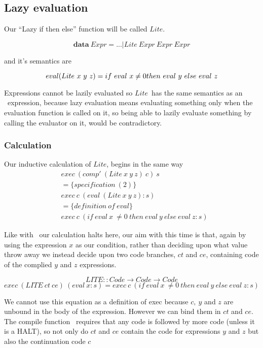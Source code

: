 \documentclass {article}
\begin{document}
\subsection{Lazy evaluation}

\newcommand{\lite}{$Lite$}

Our ``Lazy if then else'' function
 will be called \lite.

	\[ \textbf{data}\ Expr = ... | Lite\ Expr\ Expr\ Expr \]

and it's semantics are

\begin{equation}
eval(Lite\ x\ y\ z) \\
	= if\ eval\ x \not= 0 then\ eval\ y\ else\ eval\ z 
			\label{evallite}
\end{equation}

Expressions cannot be lazily evaluated
so \lite\ has the same semantics
as an \ite\ expression,
because lazy evaluation means evaluating
something only when the evaluation function
is called on it,
so being able to lazily evaluate something 
by calling the evaluator on it,
would be contradictory.

\subsubsection{Calculation}

Our inductive calculation of \lite,
begins in the same way
\begin{align*}
	&exec\ (comp'\ (Lite\ x\ y\ z)\ c)\ s \\
	&= \{specification\ (2) \} \\
	&exec\ c\ (eval\ (Lite\ x\ y\ z) : s) \\
	&= \{definition\ of\ eval\} \\
	&exec\ c\ (if\ eval\ x\ \not= 0\ then\ eval\ y\ else\ eval\ z : s)
\end{align*}

Like with \ite\ our calculation halts here,
our aim with this time is that, again by using
the expression $x$ as our condition,
rather than deciding upon what value throw away
we instead decide upon two code branches, $ct$ and $ce$,
containing code of the complied $y$ and $z$ expressions.

	\[ LITE :: Code \rightarrow Code \rightarrow Code \]
	\[ exec\ (LITE\ ct\ ce)\ (eval\ x:s) 
	= exec\ c\ (if\ eval\ x\ \not= 0\ then\ eval\ y\ else\ eval\ z : s) \]

We cannot use this equation as a definition of exec 
because $c,\ y$ and $z$ are unbound in the 
body of the expression\cite[page 10]{bandh}.
However we can bind them in $ct$ and $ce$.
The compile function \compp\ requires that any code is followed by
more code (unless it is a HALT),
so not only do  $ct$ and $ce$ contain the code for expressions
 $y$ and $z$ but also the continuation code $c$
\end{document}
